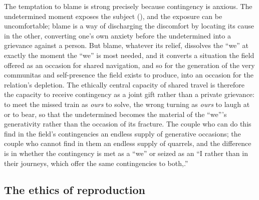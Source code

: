 The temptation to blame is strong precisely because contingency is anxious. The undetermined moment exposes the subject (), and the exposure can be uncomfortable; blame is a way of discharging the discomfort by locating its cause in the other, converting one's own anxiety before the undetermined into a grievance against a person. But blame, whatever its relief, dissolves the ``we'' at exactly the moment the ``we'' is most needed, and it converts a situation the field offered as an occasion for shared navigation, and so for the generation of the very communitas and self-presence the field exists to produce, into an occasion for the relation's depletion. The ethically central capacity of shared travel is therefore the capacity to receive contingency as a joint gift rather than a private grievance: to meet the missed train as \emph{ours} to solve, the wrong turning as \emph{ours} to laugh at or to bear, so that the undetermined becomes the material of the ``we'''s generativity rather than the occasion of its fracture. The couple who can do this find in the field's contingencies an endless supply of generative occasions; the couple who cannot find in them an endless supply of quarrels, and the difference is in whether the contingency is met as a ``we'' or seized as an ``I rather than in their journeys, which offer the same contingencies to both,.''

\subsection{The ethics of reproduction}
\label{p21:sub:ethics-reproduction}

